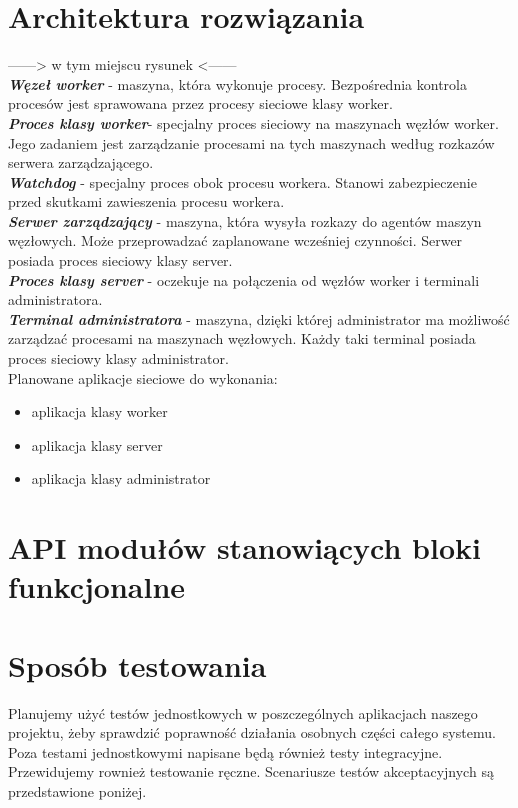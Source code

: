\documentclass[paper=a4, fontsize=11pt]{scrartcl} %
\begin{document}
\section*{Architektura rozwiązania} 
------> w tym miejscu rysunek <------ \\
\textbf{\textit{Węzeł worker}} - maszyna, która wykonuje procesy. Bezpośrednia kontrola procesów jest sprawowana przez procesy sieciowe klasy worker.\\
\textbf{\textit{Proces klasy worker}}- specjalny proces sieciowy na maszynach węzłów worker. Jego zadaniem jest zarządzanie procesami na tych maszynach według rozkazów serwera zarządzającego.\\
\textbf{\textit{Watchdog}} - specjalny proces obok procesu workera. Stanowi zabezpieczenie przed skutkami zawieszenia procesu workera. \\
\textbf{\textit{Serwer zarządzający}} - maszyna, która wysyła rozkazy do agentów maszyn węzłowych. Może przeprowadzać zaplanowane wcześniej czynności. Serwer posiada proces sieciowy klasy server.\\
\textbf{\textit{Proces klasy server}} - oczekuje na połączenia od węzłów worker i terminali administratora.\\
\textbf{\textit{Terminal administratora}} - maszyna, dzięki której administrator ma możliwość zarządzać procesami na maszynach węzłowych. Każdy taki terminal posiada proces sieciowy klasy administrator.\\

Planowane aplikacje sieciowe do wykonania:
\begin{itemize}
\item aplikacja klasy worker
\item aplikacja klasy server
\item aplikacja klasy administrator
\end{itemize}

\section*{API modułów stanowiących bloki funkcjonalne}

\section*{Sposób testowania} 
Planujemy użyć testów jednostkowych w poszczególnych aplikacjach naszego projektu, żeby sprawdzić poprawność działania osobnych części całego systemu. Poza testami jednostkowymi napisane będą również testy integracyjne. Przewidujemy rownież testowanie ręczne. Scenariusze testów akceptacyjnych są przedstawione poniżej.
\end{document}
